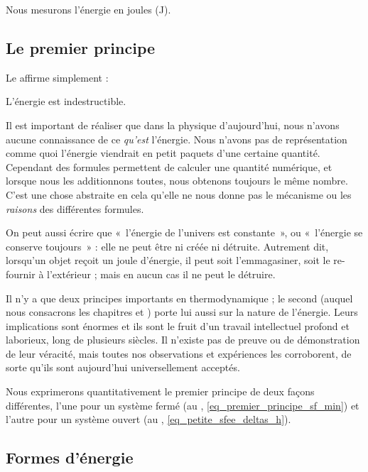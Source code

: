 		Nous mesurons l’énergie en \si{joules} (\si{\joule}).
	
	\subsection{Le premier principe}
		\label{ch_premier_principe}

		Le  affirme simplement :

		\begin{principe}
				L’énergie est indestructible.
		\end{principe}

			Il est important de réaliser que dans la physique d’aujourd’hui, nous n’avons aucune connaissance de ce \emph{qu’est} l’énergie. Nous n’avons pas de représentation comme quoi l’énergie viendrait en petit paquets d’une certaine quantité. Cependant des formules permettent de calculer une quantité numérique, et lorsque nous les additionnons toutes, nous obtenons toujours le même nombre. C’est une chose abstraite en cela qu’elle ne nous donne pas le mécanisme ou les \emph{raisons} des différentes formules.

		On peut aussi écrire que «~l’énergie de l’univers est constante~», ou «~l’énergie se conserve toujours~» : elle ne peut être ni créée ni détruite. Autrement dit, lorsqu’un objet reçoit un \si{joule} d’énergie, il peut soit l’emmagasiner, soit le re-fournir à l’extérieur ; mais en aucun cas il ne peut le détruire.

		Il n’y a que deux principes importants en thermodynamique ; le second (auquel nous consacrons les chapitres \sept et \huit) porte lui aussi sur la nature de l’énergie. Leurs implications sont énormes et ils sont le fruit d’un travail intellectuel profond et laborieux, long de plusieurs siècles. Il n’existe pas de preuve ou de démonstration de leur véracité, mais toutes nos observations et expériences les corroborent, de sorte qu’ils sont aujourd’hui universellement acceptés.
		
		Nous exprimerons quantitativement le premier principe de deux façons différentes, l’une pour un système fermé (au \coursdeuxshort, \cref{eq_premier_principe_sf_min}) et l’autre pour un système ouvert (au \courstroisshort, \cref{eq_petite_sfee_deltas_h}).
	
	
	\subsection{Formes d’énergie}
	

